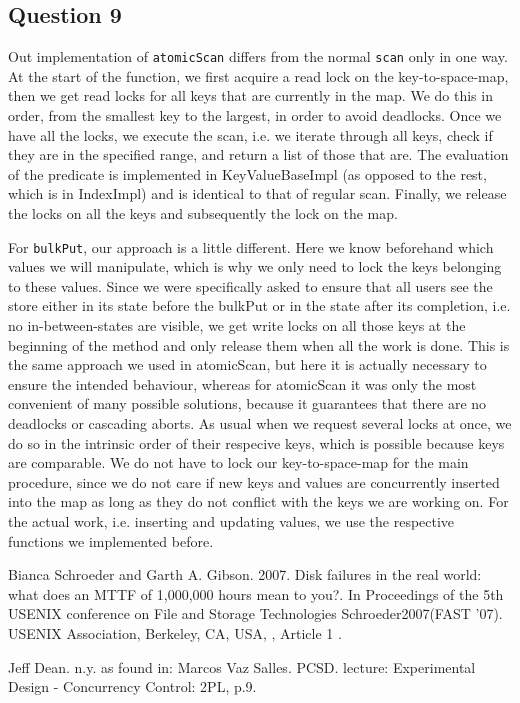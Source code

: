 \documentclass[12pt,a4paper]{article}
\begin{document}
\subsection*{Question 9}
\label{sec:pq9}
Out implementation of \texttt{atomicScan} differs from the normal \texttt{scan} only in one way. At the start of the function, we first acquire a read lock on the key-to-space-map, then we get read locks for all keys that are currently in the map. We do this in order, from the smallest key to the largest, in order to avoid deadlocks. Once we have all the locks, we execute the scan, i.e. we iterate through all keys, check if they are in the specified range, and return a list of those that are. The evaluation of the predicate is implemented in KeyValueBaseImpl (as opposed to the rest, which is in IndexImpl) and is identical to that of regular scan. Finally, we release the locks on all the keys and subsequently the lock on the map.

For \texttt{bulkPut}, our approach is a little different. Here we know beforehand which values we will manipulate, which is why we only need to lock the keys belonging to these values. Since we were specifically asked to ensure that all users see the store either in its state before the bulkPut or in the state after its completion, i.e. no in-between-states are visible, we get write locks on all those keys at the beginning of the method and only release them when all the work is done. This is the same approach we used in atomicScan, but here it is actually necessary to ensure the intended behaviour, whereas for atomicScan it was only the most convenient of many possible solutions, because it guarantees that there are no deadlocks or cascading aborts. As usual when we request several locks at once, we do so in the intrinsic order of their respecive keys, which is possible because keys are comparable. We do not have to lock our key-to-space-map for the main procedure, since we do not care if new keys and values are concurrently inserted into the map as long as they do not conflict with the keys we are working on. For the actual work, i.e. inserting and updating values, we use the respective functions we implemented before.
 
\begin{thebibliography}{1}

 Bianca Schroeder and Garth A. Gibson. 2007. Disk failures in the real world: what does an MTTF of 1,000,000 hours mean to you?. In Proceedings of the 5th USENIX conference on File and Storage Technologies Schroeder2007(FAST '07). USENIX Association, Berkeley, CA, USA, , Article 1 .

 Jeff Dean. n.y. as found in: Marcos Vaz Salles. PCSD. lecture: Experimental Design - Concurrency Control: 2PL, p.9.

\end{thebibliography}
\end{document}
